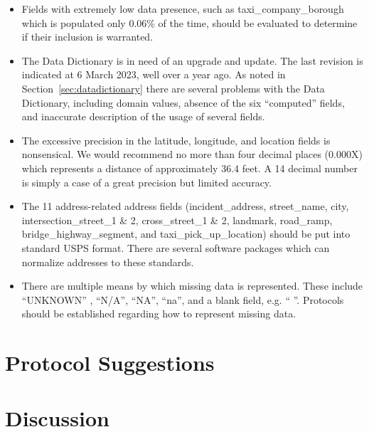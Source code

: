 \documentclass[12pt, titlepage]{article}
\begin{document}
\begin{itemize}
	\item Fields with extremely low data presence, such as taxi\_company\_borough 
	which is populated only 0.06\% of the time, should be evaluated 
	to determine if their inclusion is warranted.
	
	\item The Data Dictionary is in need of an upgrade and update. The last 
	revision is indicated at 6 March 2023, well over a year ago. 	As noted 
	in Section~\ref{sec:datadictionary} there are several problems 
	with the Data Dictionary, including domain values, absence of 
	the six ``computed'' fields, and inaccurate description of the usage of 
	several fields.
	
	\item The excessive precision in the latitude, longitude, and location 
	fields is  nonsensical.  We would recommend no more than 
	four decimal places (0.000X) which represents a distance of approximately 
	36.4 feet. A 14 decimal number is simply a case of a great 
	precision but limited accuracy.

	\item The 11 address-related address fields (incident\_address, 
	street\_name, city, intersection\_street\_1 \& 2, cross\_street\_1 \& 2,  
	landmark, road\_ramp, bridge\_highway\_segment, and 
	taxi\_pick\_up\_location) should be put into standard USPS format. There 
	are several software packages which can normalize addresses to 
	these standards.
	
	\item There are multiple means by which missing data is 
	represented. These include ``UNKNOWN'' , ``N/A'', ``NA'', ``na'', and 
	a blank field, e.g. `` ''. Protocols should be established 
	regarding how to represent missing data.
\end{itemize}



\section{Protocol Suggestions} \label{sec:protocol}



\section{Discussion} \label{sec:discussion}



\end{document}
